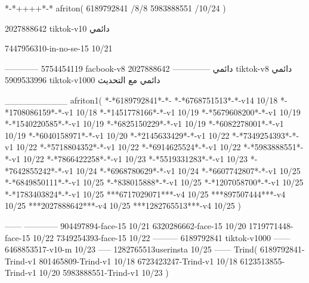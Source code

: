 *-*++++*-*
afriton(
6189792841 /8/8
5983888551 /10/24
)

2027888642 tiktok-v10
دائمي


7447956310-in-no-se-15 10/21

------------
5754454119 facbook-v8
دائمي
--------------
2027888642 tiktok-v8
دائمي
5909533996 tiktok-v1000
دائمي مع التحديث

__________
afriton1(
*-*6189792841*-*-
*-*6768751513*-*-v14 10/18
*-*1708086159*-*-v1 10/18
*-*1451778166*-*-v1 10/19
*-*5679608200*-*-v1 10/19
*-*1540220585*-*-v1 10/19
*-*6825150229*-*-v1 10/19
*-*6082278001*-*-v1 10/19
*-*6040158971*-*-v1 10/20
*-*2145633429*-*-v1 10/22
*-*7349254393*-*-v1 10/22
*-*5718804352*-*-v1 10/22
*-*6914625524*-*-v1 10/22
*-*5983888551*-*-v1 10/22
*-*7866422258*-*-v1 10/23
*-*5519331283*-*-v1 10/23
*-*7642855242*-*-v1 10/24
*-*6968780629*-*-v1 10/24
*-*6607742807*-*-v1 10/25
*-*6849850111*-*-v1 10/25
*-*838015888*-*-v1 10/25
*-*1207058700*-*-v1 10/25
*-*1783403824*-*-v1 10/25
***6717029071***-v4 10/25
***897507444***-v4 10/25
***2027888642***-v4 10/25
***1282765513***-v4 10/25
)

------
------------
904497894-face-15 10/21
6320286662-face-15 10/20
1719771448-face-15 10/22
7349254393-face-15 10/22
---------
6189792841 tiktok-v1000
------
6468853517-v10-m 10/23
-----
1282765513userinsta 10/25
------
Trind(
6189792841-Trind-v1 
801465809-Trind-v1 10/18
6723423247-Trind-v1 10/18
6123513855-Trind-v1 10/20
5983888551-Trind-v1 10/23
)

